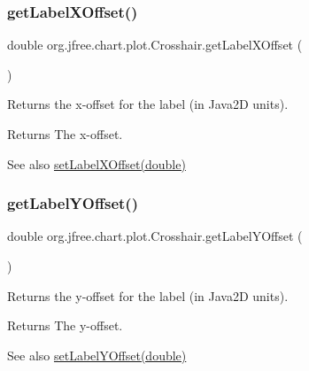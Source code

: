 \subsubsection{\texorpdfstring{get\+Label\+X\+Offset()}{getLabelXOffset()}}
{\footnotesize\ttfamily double org.\+jfree.\+chart.\+plot.\+Crosshair.\+get\+Label\+X\+Offset (\begin{DoxyParamCaption}{ }\end{DoxyParamCaption})}

Returns the x-\/offset for the label (in Java2D units).

\begin{DoxyReturn}{Returns}
The x-\/offset.
\end{DoxyReturn}
\begin{DoxySeeAlso}{See also}
\mbox{\hyperlink{classorg_1_1jfree_1_1chart_1_1plot_1_1_crosshair_a75ba4d6a36718d4c71a71fd65f2896f9}{set\+Label\+X\+Offset(double)}} 
\end{DoxySeeAlso}
\mbox{\label{classorg_1_1jfree_1_1chart_1_1plot_1_1_crosshair_a83c5071b95c67fc816c44dff9749d636}} 
\subsubsection{\texorpdfstring{get\+Label\+Y\+Offset()}{getLabelYOffset()}}
{\footnotesize\ttfamily double org.\+jfree.\+chart.\+plot.\+Crosshair.\+get\+Label\+Y\+Offset (\begin{DoxyParamCaption}{ }\end{DoxyParamCaption})}

Returns the y-\/offset for the label (in Java2D units).

\begin{DoxyReturn}{Returns}
The y-\/offset.
\end{DoxyReturn}
\begin{DoxySeeAlso}{See also}
\mbox{\hyperlink{classorg_1_1jfree_1_1chart_1_1plot_1_1_crosshair_a0eeeea778eddf6aca775cb191555f67b}{set\+Label\+Y\+Offset(double)}} 
\end{DoxySeeAlso}
\mbox{\label{classorg_1_1jfree_1_1chart_1_1plot_1_1_crosshair_a95c5923d9ef143cea6cdd735d43f420a}} 
